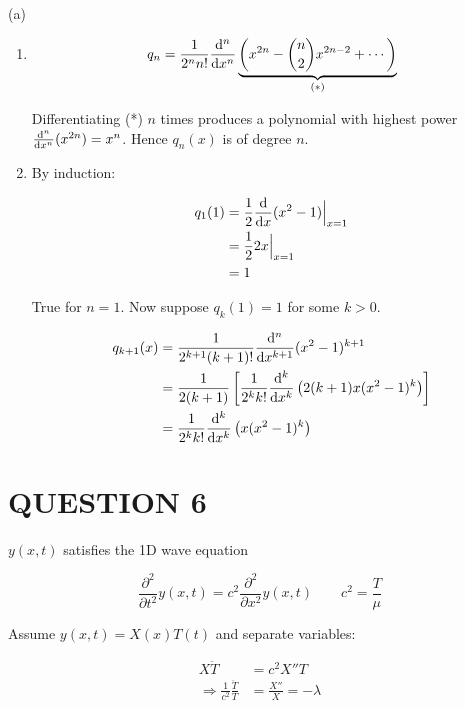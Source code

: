 \documentclass[a4paper]{article}
\begin{document}
(a)
\begin{enumerate}
	\item 
	
	\[ q_{n} = \frac{1}{2^{n} n!} \frac{\mathrm{d}^{n} }{\mathrm{d} x^{n}} \underbrace{\left(  x^{2n} - \binom{n}{2} x^{2n - 2} + \cdots  \right)}_{(*)}    \]
	
	Differentiating (*) $ n $ times produces a polynomial with highest power $ \frac{\mathrm{d}^{n} }{\mathrm{d} x^{n} } (x^{2n}) = x^{n} $. Hence $ q_{n}(x) $ is of degree $ n $.
	
	\item By induction: 
	
	\begin{align*}
	 q_{1}(1) & = \frac{1}{2} \frac{\mathrm{d} }{\mathrm{d} x} (x^{2} - 1) \Big|_{x=1} \\
	& = \frac{1}{2} 2x \Big|_{x=1} \\
	& = 1
	\end{align*}
	
	True for $ n = 1 $. Now suppose $ q_{k}(1) = 1 $ for some $ k > 0 $.
	
	\begin{align*}
	q_{k+1}(x) & = \frac{1}{2^{k+1} (k+1)!} \frac{\mathrm{d}^{n} }{\mathrm{d} x^{k+1}} (x^{2} - 1)^{k+1}   \\
	& =  \frac{1}{2 (k+1)} \left[  \frac{1}{2^{k} k!} \frac{\mathrm{d}^{k} }{\mathrm{d} x^{k}} \left(  2(k+1)x(x^{2} - 1)^{k}  \right)   \right]  \\
	& =  \frac{1}{2^{k} k!} \frac{\mathrm{d}^{k} }{\mathrm{d} x^{k}} \left( x(x^{2} - 1)^{k}  \right) 
	\end{align*}
	
	
	
\end{enumerate}

\section{QUESTION 6}


$ y(x,t) $ satisfies the 1D wave equation

\[ \frac{\partial^{2} }{\partial t^2} y(x,t) = c^{2} \frac{\partial^{2} }{\partial x^{2}} y(x,t) \qquad c^{2} = \frac{T}{\mu} \]


Assume $ y(x,t) = X(x) T(t) $ and separate variables:

\begin{align*}
X \ddot{T} & = c^{2} X'' T \\
\Rightarrow \frac{1}{c^{2}} \frac{\ddot{T}}{T}  & = \frac{X''}{X} = - \lambda 
\end{align*}
\end{document}
